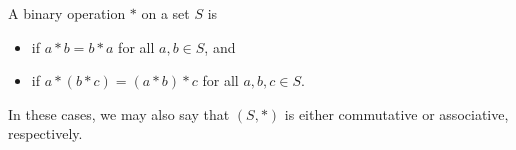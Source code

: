\documentclass[11pt,fleqn,dvipsnames,usenames]{article}
\newcommand{\p}{\noindent}
\begin{document}
\begin{definition}
A binary operation $*$ on a set $S$ is
\begin{itemize}
\item {} if $a*b = b*a$ for all $a,b\in S$, and
\item {} if $a*(b*c) = (a*b)*c$ for all $a,b,c\in S$.
\end{itemize}
\p In these cases, we may also say that $(S,*)$ is either commutative or associative, respectively.
\end{definition}
\newpage
%
\begin{examples*}~
\end{examples*}
\end{document}
